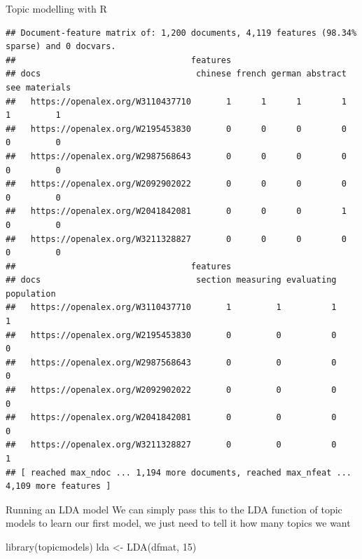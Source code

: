 \documentclass[
  10pt,
  ignorenonframetext,
  aspectratio=169]{beamer}
\newenvironment{Shaded}{\begin{snugshade}}{\end{snugshade}}
\newcommand{\DecValTok}[1]{\textcolor[rgb]{0.86,0.86,0.80}{#1}}
\newcommand{\FunctionTok}[1]{\textcolor[rgb]{0.94,0.94,0.56}{#1}}
\newcommand{\NormalTok}[1]{\textcolor[rgb]{0.80,0.80,0.80}{#1}}
\newcommand{\OtherTok}[1]{\textcolor[rgb]{0.94,0.94,0.56}{#1}}
\begin{document}
\begin{frame}[fragile]{Topic modelling with R}
\begin{verbatim}
## Document-feature matrix of: 1,200 documents, 4,119 features (98.34% sparse) and 0 docvars.
##                                   features
## docs                               chinese french german abstract see materials
##   https://openalex.org/W3110437710       1      1      1        1   1         1
##   https://openalex.org/W2195453830       0      0      0        0   0         0
##   https://openalex.org/W2987568643       0      0      0        0   0         0
##   https://openalex.org/W2092902022       0      0      0        0   0         0
##   https://openalex.org/W2041842081       0      0      0        1   0         0
##   https://openalex.org/W3211328827       0      0      0        0   0         0
##                                   features
## docs                               section measuring evaluating population
##   https://openalex.org/W3110437710       1         1          1          1
##   https://openalex.org/W2195453830       0         0          0          0
##   https://openalex.org/W2987568643       0         0          0          0
##   https://openalex.org/W2092902022       0         0          0          0
##   https://openalex.org/W2041842081       0         0          0          0
##   https://openalex.org/W3211328827       0         0          0          1
## [ reached max_ndoc ... 1,194 more documents, reached max_nfeat ... 4,109 more features ]
\end{verbatim}
\end{frame}

\begin{frame}[fragile]{Running an LDA model}
\protect\hypertarget{running-an-lda-model}{}
We can simply pass this to the LDA function of topic models to learn our
first model, we just need to tell it how many topics we want

\medskip
\scriptsize

\begin{Shaded}
\begin{Highlighting}[]
\FunctionTok{library}\NormalTok{(topicmodels)}
\NormalTok{lda }\OtherTok{\textless{}{-}} \FunctionTok{LDA}\NormalTok{(dfmat, }\DecValTok{15}\NormalTok{)}
\end{Highlighting}
\end{Shaded}
\end{frame}
\end{document}
